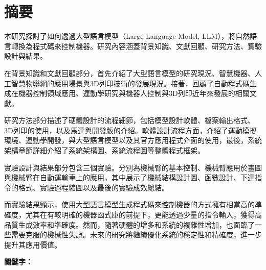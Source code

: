 \documentclass[class=NCU_thesis, crop=false]{standalone}
\begin{document}
\chapter{摘要}

本研究探討了如何透過大型語言模型（Large Language Model, LLM），將自然語言轉換為程式碼來控制機器。研究內容涵蓋背景知識、文獻回顧、研究方法、實驗設計與結果。

在背景知識和文獻回顧部分，首先介紹了大型語言模型的研究現況、智慧機器、人工智慧物聯網的應用場景與3D列印技術的發展現況。接著，回顧了自動程式碼生成在機器控制領域應用、運動學研究與機器人控制與3D列印近年來發展的相關文獻。

研究方法部分描述了硬體設計的流程細節，包括模型設計軟體、檔案輸出格式、3D列印的使用，以及馬達與開發版的介紹。軟體設計流程方面，介紹了運動模擬環境、運動學開發，與大型語言模型以及其官方應用程式介面的使用，最後，系統架構章節詳細介紹了系統架構圖、系統流程圖等整體程式框架。

實驗設計與結果部分包含三個實驗。分別為機械臂的基本控制、機械臂應用於畫圖與機械臂在自動運輸車上的應用，其中展示了機械結構設計圖、函數設計、下達指令的格式、實驗過程縮圖以及最後的實驗成效總結。

而實驗結果顯示，使用大型語言模型生成程式碼來控制機器的方式擁有相當高的準確度，尤其在有較明確的機器函式庫的前提下，更能透過少量的指令輸入，獲得高品質生成效率和準確度。然而，隨著硬體的增多和系統的複雜性增加，也面臨了一些需要克服的機械性失誤。未來的研究將繼續優化系統的穩定性和精確度，進一步提升其應用價值。

\vspace{2em}
\noindent \textbf{關鍵字：} \keywordsZh{} %
\end{document}
